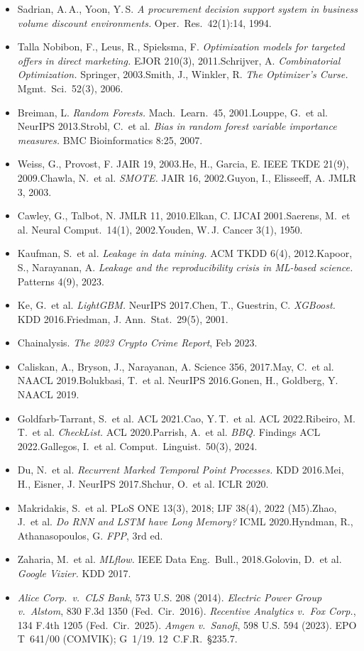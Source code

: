 \documentclass[10pt,a4paper]{article}
\begin{document}
\begin{itemize}[leftmargin=1.2em,itemsep=1pt]
  \item Sadrian, A.\,A., Yoon, Y.\,S. \emph{A procurement decision support system in business volume discount environments.} Oper.\ Res.\ 42(1):14, 1994.
  \item Talla Nobibon, F., Leus, R., Spieksma, F. \emph{Optimization models for targeted offers in direct marketing.} EJOR 210(3), 2011.\quad Schrijver, A. \emph{Combinatorial Optimization.} Springer, 2003.\quad Smith, J., Winkler, R. \emph{The Optimizer's Curse.} Mgmt.\ Sci.\ 52(3), 2006.
  \item Breiman, L. \emph{Random Forests.} Mach.\ Learn.\ 45, 2001.\quad Louppe, G.\ et al. NeurIPS 2013.\quad Strobl, C.\ et al. \emph{Bias in random forest variable importance measures.} BMC Bioinformatics 8:25, 2007.
  \item Weiss, G., Provost, F. JAIR 19, 2003.\quad He, H., Garcia, E. IEEE TKDE 21(9), 2009.\quad Chawla, N.\ et al. \emph{SMOTE.} JAIR 16, 2002.\quad Guyon, I., Elisseeff, A. JMLR 3, 2003.
  \item Cawley, G., Talbot, N. JMLR 11, 2010.\quad Elkan, C. IJCAI 2001.\quad Saerens, M.\ et al. Neural Comput.\ 14(1), 2002.\quad Youden, W.\,J. Cancer 3(1), 1950.
  \item Kaufman, S.\ et al. \emph{Leakage in data mining.} ACM TKDD 6(4), 2012.\quad Kapoor, S., Narayanan, A. \emph{Leakage and the reproducibility crisis in ML-based science.} Patterns 4(9), 2023.
  \item Ke, G.\ et al. \emph{LightGBM.} NeurIPS 2017.\quad Chen, T., Guestrin, C. \emph{XGBoost.} KDD 2016.\quad Friedman, J. Ann.\ Stat.\ 29(5), 2001.
  \item Chainalysis. \emph{The 2023 Crypto Crime Report}, Feb 2023.
  \item Caliskan, A., Bryson, J., Narayanan, A. Science 356, 2017.\quad May, C.\ et al. NAACL 2019.\quad Bolukbasi, T.\ et al. NeurIPS 2016.\quad Gonen, H., Goldberg, Y. NAACL 2019.
  \item Goldfarb-Tarrant, S.\ et al. ACL 2021.\quad Cao, Y.\,T.\ et al. ACL 2022.\quad Ribeiro, M.\,T.\ et al. \emph{CheckList.} ACL 2020.\quad Parrish, A.\ et al. \emph{BBQ.} Findings ACL 2022.\quad Gallegos, I.\ et al. Comput.\ Linguist.\ 50(3), 2024.
  \item Du, N.\ et al. \emph{Recurrent Marked Temporal Point Processes.} KDD 2016.\quad Mei, H., Eisner, J. NeurIPS 2017.\quad Shchur, O.\ et al. ICLR 2020.
  \item Makridakis, S.\ et al. PLoS ONE 13(3), 2018; IJF 38(4), 2022 (M5).\quad Zhao, J.\ et al. \emph{Do RNN and LSTM have Long Memory?} ICML 2020.\quad Hyndman, R., Athanasopoulos, G. \emph{FPP}, 3rd ed.
  \item Zaharia, M.\ et al. \emph{MLflow.} IEEE Data Eng.\ Bull., 2018.\quad Golovin, D.\ et al. \emph{Google Vizier.} KDD 2017.
  \item \emph{Alice Corp.\ v.\ CLS Bank}, 573 U.S. 208 (2014). \emph{Electric Power Group v.\ Alstom}, 830 F.3d 1350 (Fed.\ Cir.\ 2016). \emph{Recentive Analytics v.\ Fox Corp.}, 134 F.4th 1205 (Fed.\ Cir.\ 2025). \emph{Amgen v.\ Sanofi}, 598 U.S. 594 (2023). EPO T~641/00 (COMVIK); G~1/19. 12~C.F.R.~\S235.7.
\end{itemize}
\end{document}
